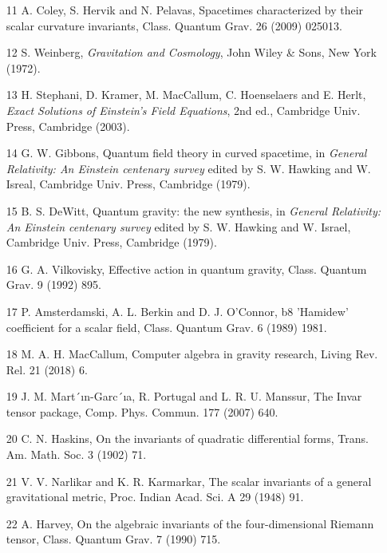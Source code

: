 \documentclass{article}
\begin{document}
\begin{itemize}
\item 
[11] A. Coley, S. Hervik and N. Pelavas, Spacetimes characterized by their scalar curvature invariants, Class. Quantum Grav. 26 (2009) 025013.

\item 
[12] S. Weinberg, \textit{Gravitation and Cosmology}, John Wiley \& Sons, New York (1972).

\item 
[13] H. Stephani, D. Kramer, M. MacCallum, C. Hoenselaers and E. Herlt, \textit{Exact Solutions of Einstein's Field Equations}, 2nd ed., Cambridge Univ. Press, Cambridge (2003).

\item 
[14] G. W. Gibbons, Quantum field theory in curved spacetime, in \textit{General Relativity: An Einstein centenary survey} edited by S. W. Hawking and W. Isreal, Cambridge Univ. Press, Cambridge (1979).

\item 
[15] B. S. DeWitt, Quantum gravity: the new synthesis, in \textit{General Relativity: An Einstein centenary survey} edited by S. W. Hawking and W. Israel, Cambridge Univ. Press, Cambridge (1979).

\item 
[16] G. A. Vilkovisky, Effective action in quantum gravity, Class. Quantum Grav. 9 (1992) 895.

\item 
[17] P. Amsterdamski, A. L. Berkin and D. J. O'Connor, b8 'Hamidew' coefficient for a scalar field, Class. Quantum Grav. 6 (1989) 1981.

\item 
[18] M. A. H. MacCallum, Computer algebra in gravity research, Living Rev. Rel. 21 (2018) 6.

\item 
[19] J. M. Mart´ın-Garc´ıa, R. Portugal and L. R. U. Manssur, The Invar tensor package, Comp. Phys. Commun. 177 (2007) 640.

\item 
[20] C. N. Haskins, On the invariants of quadratic differential forms, Trans. Am. Math. Soc. 3 (1902) 71.

\item 
[21] V. V. Narlikar and K. R. Karmarkar, The scalar invariants of a general gravitational metric, Proc. Indian Acad. Sci. A 29 (1948) 91.

\item 
[22] A. Harvey, On the algebraic invariants of the four-dimensional Riemann tensor, Class. Quantum Grav. 7 (1990) 715.


\end{itemize}
\end{document}
